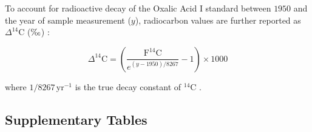 \documentclass[preprint,12pt]{elsarticle}
\begin{document}
To account for radioactive decay of the Oxalic Acid I standard between $1950$ and the year of sample measurement ($y$), radiocarbon values are further reported as $\Delta^{14}\text{C}$ ($\text{\textperthousand}$) \citep{Trumbore2016}:

\begin{equation}
\Delta^{14}\text{C} = \left( \frac{\text{F}^{14}\text{C}}{e^{(y - 1950)/8267}} - 1 \right) \times 1000
\end{equation}

where $1/8267\,\text{yr}^{-1}$ is the true decay constant of $^{14}\text{C}$ \citep{Trumbore2016}.

\clearpage

\subsection{Supplementary Tables}
\label{sec:si_tables}
  
\end{document}

